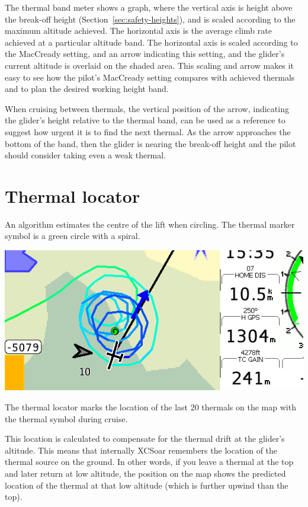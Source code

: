 The thermal band meter shows a graph, where the vertical axis is
height above the break-off height (Section~\ref{sec:safety-heights}), and is
scaled according to the maximum altitude achieved.  The horizontal axis is the average climb
rate achieved at a particular altitude band.  The horizontal axis is
scaled according to the MacCready setting, and an arrow indicating this
setting, and the glider's current altitude is overlaid on the shaded
area.  This scaling and arrow makes it easy to see how the pilot's
MacCready setting compares with achieved thermals and to plan the
desired working height band.

When cruising between thermals, the vertical position of the arrow,
indicating the glider's height relative to the thermal band, can be
used as a reference to suggest how urgent it is to find the next
thermal.  As the arrow approaches the bottom of the band, then the
glider is nearing the break-off height and the pilot should consider
taking even a weak thermal.

\section{Thermal locator}
An algorithm estimates the centre of the lift when circling.  The
thermal marker symbol is a green circle with a spiral.

\begin{center}
\includegraphics[angle=0,width=0.8\linewidth,keepaspectratio='true']{figures/shot-tlocator-circling.png}
\end{center}

The thermal locator marks the location of the last 20 
thermals on the map with the thermal symbol during cruise.

This location is calculated to compensate for the thermal drift at 
the glider's altitude.  This means that internally XCSoar remembers 
the location of the thermal source on the ground.  In other words, 
if you leave a thermal at the top and later return at low altitude, 
the position on the map shows the predicted location of the thermal 
at that low altitude (which is further upwind than the top).  

